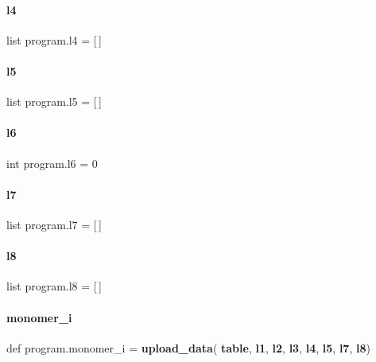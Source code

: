 \paragraph{l4}
{\footnotesize\ttfamily list program.\+l4 = [$\,$]}

\mbox{\label{namespaceprogram_abb9e824cbc2cf31332e6b4bfdef5292c}} 
\paragraph{l5}
{\footnotesize\ttfamily list program.\+l5 = [$\,$]}

\mbox{\label{namespaceprogram_acc31c6aeaa54d2cba5065f2c1b013c60}} 
\paragraph{l6}
{\footnotesize\ttfamily int program.\+l6 = 0}

\mbox{\label{namespaceprogram_aa7252697ce709732ea4c9d3ba4ac08a0}} 
\paragraph{l7}
{\footnotesize\ttfamily list program.\+l7 = [$\,$]}

\mbox{\label{namespaceprogram_a2e6990c2778c0d534974ced34c8d7d43}} 
\paragraph{l8}
{\footnotesize\ttfamily list program.\+l8 = [$\,$]}

\mbox{\label{namespaceprogram_a282e8ffbb5b2791e00ca1d1923c4f889}} 
\paragraph{monomer\+\_\+i}
{\footnotesize\ttfamily def program.\+monomer\+\_\+i = \textbf{ upload\+\_\+data}(\textbf{ table}, \textbf{ l1}, \textbf{ l2}, \textbf{ l3}, \textbf{ l4}, \textbf{ l5}, \textbf{ l7}, \textbf{ l8})}

\mbox{\label{namespaceprogram_a5e61cf96fe09fa76b9a539537c55cfea}} 
